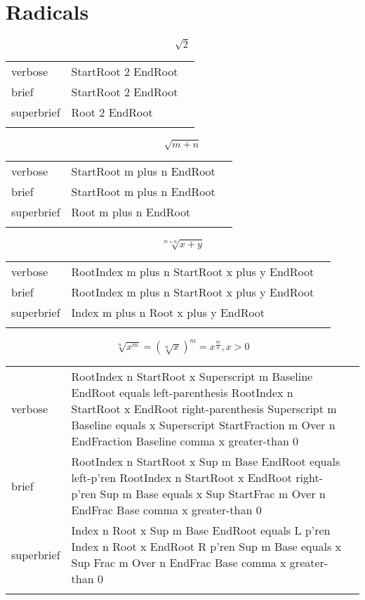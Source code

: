 
\section{Radicals}
\label{sec:radicals}

\R
\E \[\sqrt{2}\]
\begin{longtable}[c]{@{}lll@{}}
\toprule\addlinespace
verbose & StartRoot 2 EndRoot &

\\\addlinespace
brief & StartRoot 2 EndRoot &

\\\addlinespace
superbrief & Root 2 EndRoot &

\\\addlinespace
\bottomrule
\end{longtable}


\E \[\sqrt{m+n}\]
\begin{longtable}[c]{@{}lll@{}}
\toprule\addlinespace
verbose & StartRoot m plus n EndRoot &

\\\addlinespace
brief & StartRoot m plus n EndRoot &

\\\addlinespace
superbrief & Root m plus n EndRoot &

\\\addlinespace
\bottomrule
\end{longtable}


\R
\E \[\sqrt[m+n]{x+y}\]
\begin{longtable}[c]{@{}lll@{}}
\toprule\addlinespace
verbose & RootIndex m plus n StartRoot x plus y EndRoot &

\\\addlinespace
brief & RootIndex m plus n StartRoot x plus y EndRoot &

\\\addlinespace
superbrief & Index m plus n Root x plus y EndRoot &

\\\addlinespace
\bottomrule
\end{longtable}


\E \[\sqrt[n]{x^m}=\left(\sqrt[n]{x}\right)^m=x^{\frac{m}{n}}, x>0\]
\begin{longtable}[c]{@{}lll@{}}
\toprule\addlinespace
verbose & RootIndex n StartRoot x Superscript m Baseline EndRoot equals
left-parenthesis RootIndex n StartRoot x EndRoot right-parenthesis
Superscript m Baseline equals x Superscript StartFraction m Over n
EndFraction Baseline comma x greater-than 0 &

\\\addlinespace
brief & RootIndex n StartRoot x Sup m Base EndRoot equals left-p'ren
RootIndex n StartRoot x EndRoot right-p'ren Sup m Base equals x Sup
StartFrac m Over n EndFrac Base comma x greater-than 0 &

\\\addlinespace
superbrief & Index n Root x Sup m Base EndRoot equals L p'ren Index n
Root x EndRoot R p'ren Sup m Base equals x Sup Frac m Over n EndFrac
Base comma x greater-than 0 &

\\\addlinespace
\bottomrule
\end{longtable}


